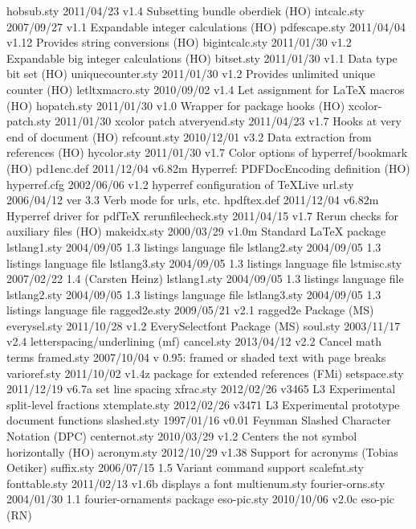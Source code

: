   hobsub.sty    2011/04/23 v1.4 Subsetting bundle oberdiek (HO)
 intcalc.sty    2007/09/27 v1.1 Expandable integer calculations (HO)
pdfescape.sty    2011/04/04 v1.12 Provides string conversions (HO)
bigintcalc.sty    2011/01/30 v1.2 Expandable big integer calculations (HO)
  bitset.sty    2011/01/30 v1.1 Data type bit set (HO)
uniquecounter.sty    2011/01/30 v1.2 Provides unlimited unique counter (HO)
letltxmacro.sty    2010/09/02 v1.4 Let assignment for LaTeX macros (HO)
 hopatch.sty    2011/01/30 v1.0 Wrapper for package hooks (HO)
xcolor-patch.sty    2011/01/30 xcolor patch
atveryend.sty    2011/04/23 v1.7 Hooks at very end of document (HO)
refcount.sty    2010/12/01 v3.2 Data extraction from references (HO)
 hycolor.sty    2011/01/30 v1.7 Color options of hyperref/bookmark (HO)
  pd1enc.def    2011/12/04 v6.82m Hyperref: PDFDocEncoding definition (HO)
hyperref.cfg    2002/06/06 v1.2 hyperref configuration of TeXLive
     url.sty    2006/04/12  ver 3.3  Verb mode for urls, etc.
 hpdftex.def    2011/12/04 v6.82m Hyperref driver for pdfTeX
rerunfilecheck.sty    2011/04/15 v1.7 Rerun checks for auxiliary files (HO)
 makeidx.sty    2000/03/29 v1.0m Standard LaTeX package
lstlang1.sty    2004/09/05 1.3 listings language file
lstlang2.sty    2004/09/05 1.3 listings language file
lstlang3.sty    2004/09/05 1.3 listings language file
 lstmisc.sty    2007/02/22 1.4 (Carsten Heinz)
lstlang1.sty    2004/09/05 1.3 listings language file
lstlang2.sty    2004/09/05 1.3 listings language file
lstlang3.sty    2004/09/05 1.3 listings language file
ragged2e.sty    2009/05/21 v2.1 ragged2e Package (MS)
everysel.sty    2011/10/28 v1.2 EverySelectfont Package (MS)
    soul.sty    2003/11/17 v2.4 letterspacing/underlining (mf)
  cancel.sty    2013/04/12 v2.2 Cancel math terms
  framed.sty    2007/10/04 v 0.95: framed or shaded text with page breaks
varioref.sty    2011/10/02 v1.4z package for extended references (FMi)
setspace.sty    2011/12/19 v6.7a set line spacing
   xfrac.sty    2012/02/26 v3465 L3 Experimental split-level fractions
xtemplate.sty    2012/02/26 v3471 L3 Experimental prototype document functions
 slashed.sty    1997/01/16 v0.01 Feynman Slashed Character Notation (DPC)
centernot.sty    2010/03/29 v1.2 Centers the not symbol horizontally (HO)
 acronym.sty    2012/10/29 v1.38 Support for acronyms (Tobias Oetiker)
  suffix.sty    2006/07/15 1.5 Variant command support
scalefnt.sty    
fonttable.sty    2011/02/13 v1.6b displays a font
multienum.sty    
fourier-orns.sty    2004/01/30 1.1 fourier-ornaments package
 eso-pic.sty    2010/10/06 v2.0c eso-pic (RN)
